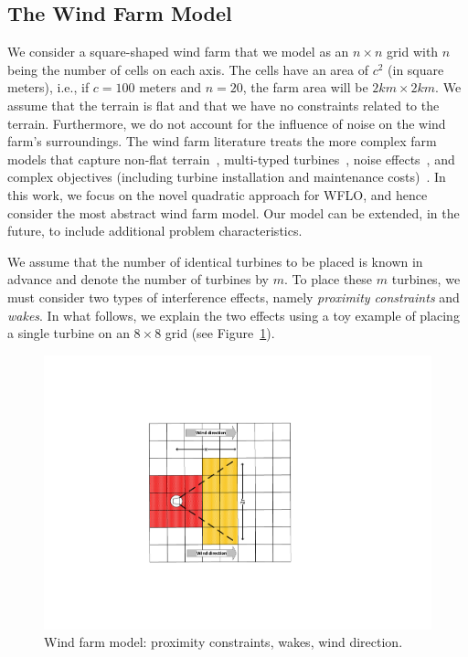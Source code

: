 \documentclass[preprint,12pt]{elsarticle}
\begin{document}
\subsection{The Wind Farm Model}

We consider a square-shaped wind farm that we model as an $n\times n$
grid with $n$ being the number of cells on each axis.  The cells have
an area of $c^2$ (in square meters), i.e., if $c=100$ meters and
$n=20$, the farm area will be $2km\times 2km$.  We
assume that the terrain is flat and that we have no constraints
related to the terrain.  Furthermore, we do not account for the
influence of noise on the wind farm's surroundings. The wind farm
literature treats the more complex farm models that capture non-flat
terrain~\cite{song2015lazy,kuo2016wind}, multi-typed
turbines~\cite{feng2017design}, noise
effects~\cite{Zhang2014,sorkhabi2016impact,yin2014multi}, and complex
objectives (including turbine installation and maintenance
costs)~\cite{lackner2007analytical,sorkhabi2018constrained}.  In this work, we focus on the
novel quadratic approach for WFLO, and hence consider the most
abstract wind farm model. Our model can be extended, in the
future, to include additional problem characteristics.
 
We assume that the number of identical turbines to be placed is known 
in advance and denote the number of turbines by $m$. To place these $m$ turbines, 
we must consider two types of interference effects, namely \emph{proximity constraints} and \emph{wakes}.
In what follows, we explain the two effects using a toy example of placing a single turbine on an 
$8\times8$ grid (see Figure~\ref{fig:field_model}).

\begin{figure}[t]
	\centering
	\includegraphics[scale = 0.9]{field_model.pdf}

	\caption{Wind farm model: proximity constraints, wakes, wind direction.}\label{fig:field_model}
\end{figure}
\end{document}
